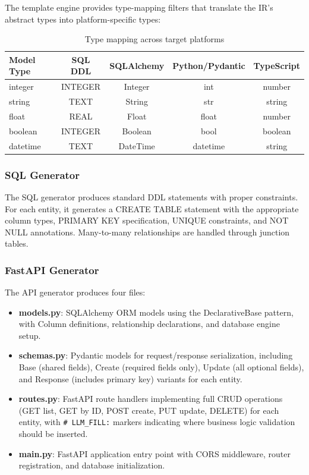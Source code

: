 \documentclass[11pt,a4paper]{article}
\begin{document}
The template engine provides type-mapping filters that translate the IR's abstract types into platform-specific types:

\begin{table}[H]
\centering
\caption{Type mapping across target platforms}
\label{tab:types}
\begin{tabular}{lcccc}
\toprule
\textbf{Model Type} & \textbf{SQL DDL} & \textbf{SQLAlchemy} & \textbf{Python/Pydantic} & \textbf{TypeScript} \\
\midrule
integer  & INTEGER  & Integer  & int      & number \\
string   & TEXT     & String   & str      & string \\
float    & REAL     & Float    & float    & number \\
boolean  & INTEGER  & Boolean  & bool     & boolean \\
datetime & TEXT     & DateTime & datetime & string \\
\bottomrule
\end{tabular}
\end{table}

\subsubsection{SQL Generator}

The SQL generator produces standard DDL statements with proper constraints. For each entity, it generates a CREATE TABLE statement with the appropriate column types, PRIMARY KEY specification, UNIQUE constraints, and NOT NULL annotations. Many-to-many relationships are handled through junction tables.

\subsubsection{FastAPI Generator}

The API generator produces four files:

\begin{itemize}
    \item \textbf{models.py}: SQLAlchemy ORM models using the DeclarativeBase pattern, with Column definitions, relationship declarations, and database engine setup.
    \item \textbf{schemas.py}: Pydantic models for request/response serialization, including Base (shared fields), Create (required fields only), Update (all optional fields), and Response (includes primary key) variants for each entity.
    \item \textbf{routes.py}: FastAPI route handlers implementing full CRUD operations (GET list, GET by ID, POST create, PUT update, DELETE) for each entity, with {\lstinline|# LLM_FILL:|} markers indicating where business logic validation should be inserted.
    \item \textbf{main.py}: FastAPI application entry point with CORS middleware, router registration, and database initialization.
\end{itemize}
\end{document}
